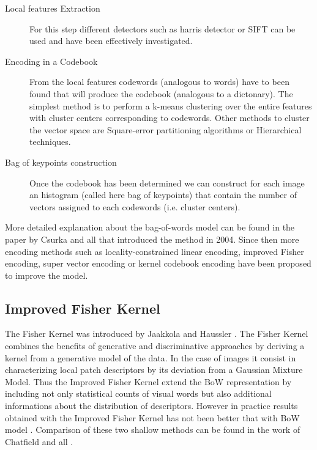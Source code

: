     \begin{description}
      \item[Local features Extraction] For this step different detectors such as harris detector or SIFT can be used and have been effectively investigated.

      \item[Encoding in a Codebook] From the local features codewords (analogous to words) have to been found that will produce the codebook (analogous to a dictonary). The simplest method is to perform a k-means clustering over the entire features with cluster centers corresponding to codewords. Other methods to cluster the vector space are Square-error partitioning algorithms or Hierarchical techniques.

      \item[Bag of keypoints construction] Once the codebook has been determined we can construct for each image an histogram (called here bag of keypoints) that contain the number of vectors assigned to each codewords (i.e. cluster centers).
    \end{description}

    More detailed explanation about the bag-of-words model can be found in the paper by Csurka and all \cite{csurka2004visual} that introduced the method in 2004. Since then more encoding methods such as locality-constrained linear encoding, improved Fisher encoding, super vector encoding or kernel codebook encoding have been proposed to improve the model.

    \subsection{Improved Fisher Kernel}

    The Fisher Kernel was introduced by Jaakkola and Haussler \cite{jaakkola1999exploiting}. The Fisher Kernel combines the benefits of generative and discriminative approaches by deriving a kernel from a generative model of the data. In the case of images it consist in characterizing local patch descriptors by its deviation from a Gaussian Mixture Model. Thus the Improved Fisher Kernel extend the BoW representation by including not only statistical counts of visual words but also additional informations about the distribution of descriptors.  However in practice results obtained with the Improved Fisher Kernel has not been better that with BoW model \cite{perronnin2010improving}. Comparison of these two shallow methods can be found in the work of Chatfield and all \cite{chatfield2011devil}.
